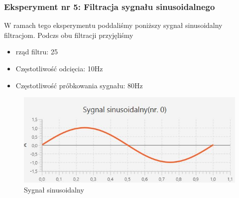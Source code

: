 \documentclass[12pt]{article}
\begin{document}
\subsubsection{Eksperyment nr 5: Filtracja sygnału sinusoidalnego} 
W ramach tego eksperymentu poddaliśmy poniższy sygnał sinusoidalny filtracjom. Podczs obu filtracji przyjęliśmy
\begin{itemize}
	\item rząd filtru: 25
	\item Częstotliwość odcięcia: 10Hz
	\item Częstotliwość próbkowania sygnału: 80Hz
\end{itemize}

\begin{figure}[H]
	\centering
	\includegraphics[width=\linewidth]{sinus-wejscie}
	\caption{Sygnał sinusoidalny}
	\label{}
\end{figure}
\end{document}
